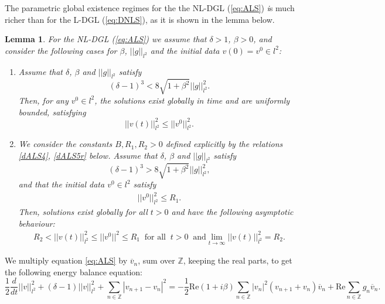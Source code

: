 \documentclass[preprintnumbers,amsmath,amssymb]{revtex4}
\newtheorem{lemma}{Lemma}[section]
\begin{document}
The parametric global existence regimes for the the NL-DGL (\ref{eq:ALS}) {\emph is much richer than for the L-DGL (\ref{eq:DNLS})}, as it is shown in the lemma below.
\begin{lemma}
	\label{nLDGL1}
	For the NL-DGL (\ref{eq:ALS}) we assume that $\delta>1$,  $\beta>0$, and consider the following cases for $\beta$, $||g||_{l^2}$ and the initial data $v(0)=v^0\in l^2$:
	\begin{enumerate}	
		\item
		Assume that $\delta$, $\beta$ and $||g||_{l^2}$  satisfy
		\begin{equation}
		\label{dALS0a}
		(\delta-1)^3<8\sqrt{1+\beta^2}||g||^2_{l^2}.
		\end{equation}
		Then, for any $v^0\in l^2$, the solutions exist globally in time and are uniformly bounded, satisfying
		\begin{equation}
		\label{eq:ALSbound}
		||v(t)||_{l^2}^2\leq ||v^0||_{l^2}^2.
		\end{equation}
		\item We consider the constants $B, R_1, R_2>0$ defined explicitly by the relations \eqref{dALS4}, \eqref{dALS5r} below. Assume that $\delta$, $\beta$ and $||g||_{l^2}$  satisfy
		\begin{equation}
		\label{dALS0b}
		(\delta-1)^3>8\sqrt{1+\beta^2}||g||^2_{l^2},
		\end{equation}
		and that the initial data $v^0\in l^2$ satisfy 
		\begin{eqnarray}
		\label{dALS0c}
		||v^0||_{l^2}^2\leq R_1.
		\end{eqnarray}
		Then, solutions exist globally for all $t>0$ and have the following asymptotic behaviour:
		\begin{eqnarray}
		\label{dANLS0d}
		R_2<||v(t)||_{l^2}^2\leq ||v^0||^2\leq R_1\;\;\mbox{for all}\;\; t > 0\;\;\mbox{and} \lim_{t\rightarrow\infty}||v(t)||_{l^2}^2=R_2.
		\end{eqnarray}
	\end{enumerate}
\end{lemma}
 We multiply equation \eqref{eq:ALS} by $\overline{v}_n$, sum over $\mathbb{Z}$, keeping the real parts, to get the following energy balance equation:
\begin{equation}
\label{dALS1}
\frac{1}{2}\frac{d}{dt}||v||_{l^2}^2+(\delta-1)||v||_{l^2}^2+\sum_{n\in\mathbb{Z}}|v_{n+1}-v_n|^2=-\frac{1}{2}\mathrm{Re}(1+i\beta)\sum_{n\in\mathbb{Z}}|v_n|^2(v_{n+1}+v_n)\overline{v}_n+\mathrm{Re}\sum_{n\in\mathbb{Z}} g_n\overline{v}_n.
\end{equation}
\end{document}
